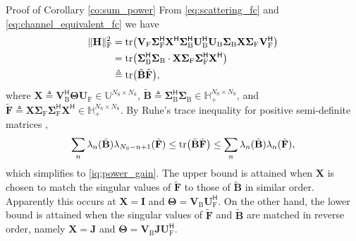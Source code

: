 \begin{appendix}
\begin{subsection}{Proof of Corollary \ref{co:sum_power}}\label{ap:sum_power}
	From \eqref{eq:scattering_fc} and \eqref{eq:channel_equivalent_fc} we have
	\begin{equation}
		\begin{split}
			\lVert \mathbf{H} \rVert _\mathrm{F}^2
			 & = \operatorname{tr} \bigl(\mathbf{V}_\mathrm{F} \mathbf{\Sigma}_\mathrm{F}^\mathsf{H} \mathbf{X}^\mathsf{H} \mathbf{\Sigma}_\mathrm{B}^\mathsf{H} \mathbf{U}_\mathrm{B}^\mathsf{H} \mathbf{U}_\mathrm{B} \mathbf{\Sigma}_\mathrm{B} \mathbf{X} \mathbf{\Sigma}_\mathrm{F} \mathbf{V}_\mathrm{F}^\mathsf{H}\bigr) \\
			 & = \operatorname{tr} \bigl(\mathbf{\Sigma}_\mathrm{B}^\mathsf{H} \mathbf{\Sigma}_\mathrm{B} \cdot \mathbf{X} \mathbf{\Sigma}_\mathrm{F} \mathbf{\Sigma}_\mathrm{F}^\mathsf{H} \mathbf{X}^\mathsf{H}\bigr)                                                                                                         \\
			 & \triangleq \operatorname{tr} \bigl(\tilde{\mathbf{B}} \tilde{\mathbf{F}}\bigr),
		\end{split}
		\label{eq:channel_power_gain}
	\end{equation}
	where $\mathbf{X} \triangleq \mathbf{V}_\mathrm{B}^\mathsf{H} \mathbf{\Theta} \mathbf{U}_\mathrm{F} \in \mathbb{U}^{N_\mathrm{S} \times N_\mathrm{S}}$, $\tilde{\mathbf{B}} \triangleq \mathbf{\Sigma}_\mathrm{B}^\mathsf{H} \mathbf{\Sigma}_\mathrm{B} \in \mathbb{H}_+^{N_\mathrm{S} \times N_\mathrm{S}}$, and $\tilde{\mathbf{F}} \triangleq \mathbf{X} \mathbf{\Sigma}_\mathrm{F} \mathbf{\Sigma}_\mathrm{F}^\mathsf{H} \mathbf{X}^\mathsf{H} \in \mathbb{H}_+^{N_\mathrm{S} \times N_\mathrm{S}}$.
	By Ruhe's trace inequality for positive semi-definite matrices \cite[(H.1.g) and (H.1.h)]{Marshall2010},
	\begin{equation*}
		\sum_n \lambda_n(\tilde{\mathbf{B}}) \lambda_{N_\mathrm{S}-n+1}(\tilde{\mathbf{F}}) \le \operatorname{tr} \bigl(\tilde{\mathbf{B}} \tilde{\mathbf{F}}\bigr) \le \sum_n \lambda_n(\tilde{\mathbf{B}}) \lambda_n(\tilde{\mathbf{F}}),
	\end{equation*}
	which simplifies to \eqref{iq:power_gain}.
	The upper bound is attained when $\mathbf{X}$ is chosen to match the singular values of $\tilde{\mathbf{F}}$ to those of $\tilde{\mathbf{B}}$ in similar order.
	Apparently this occurs at $\mathbf{X} = \mathbf{I}$ and $\mathbf{\Theta} = \mathbf{V}_\mathrm{B} \mathbf{U}_\mathrm{F}^\mathsf{H}$.
	On the other hand, the lower bound is attained when the singular values of $\tilde{\mathbf{F}}$ and $\tilde{\mathbf{B}}$ are matched in reverse order, namely $\mathbf{X} = \mathbf{J}$ and $\mathbf{\Theta} = \mathbf{V}_\mathrm{B} \mathbf{J} \mathbf{U}_\mathrm{F}^\mathsf{H}$.
\end{subsection}


\end{appendix}
